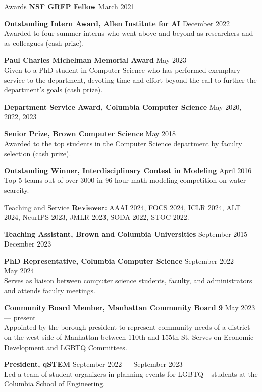\documentclass{resume} %
\begin{document}
\begin{rSection}{Awards} \itemsep -2pt
\textbf{NSF GRFP Fellow} \hfill March 2021

\textbf{Outstanding Intern Award, Allen Institute for AI} \hfill December 2022\\
Awarded to four summer interns who went above and beyond as researchers and as colleagues (cash prize).

\textbf{Paul Charles Michelman Memorial Award} \hfill May 2023 \\
Given to a PhD student in Computer Science who has performed exemplary service to the department, devoting time and effort beyond the call to further the department’s goals (cash prize).

\textbf{Department Service Award, Columbia Computer Science} \hfill May 2020, 2022, 2023

\textbf{Senior Prize, Brown Computer Science} \hfill May 2018 \\
Awarded to the top students in the Computer Science department by faculty selection (cash prize).

\textbf{Outstanding Winner, Interdisciplinary Contest in Modeling} \hfill April 2016 \\
Top 5 teams out of over 3000 in 96-hour math modeling competition on water scarcity.
\end{rSection}


\begin{rSection}{Teaching and Service} \itemsep -2pt
\textbf{Reviewer:} AAAI 2024, FOCS 2024, ICLR 2024, ALT 2024, NeurIPS 2023, JMLR 2023, SODA 2022, STOC 2022. 


\textbf{Teaching Assistant, Brown and Columbia Universities} \hfill September 2015 --- December 2023 

\textbf{PhD Representative, Columbia Computer Science} \hfill September 2022 --- May 2024 \\
Serves as liaison between computer science students, faculty, and administrators and attends faculty meetings.

\textbf{Community Board Member, Manhattan Community Board 9} \hfill May 2023 --- present \\
Appointed by the borough president to represent community needs of a district on the west side of Manhattan between 110th and 155th St. Serves on Economic Development and LGBTQ Committees.

\textbf{President, qSTEM} \hfill September 2022 --- September 2023 \\
Led a team of student organizers in planning events for LGBTQ+ students at the Columbia School of Engineering. 


\end{rSection}
\end{document}
